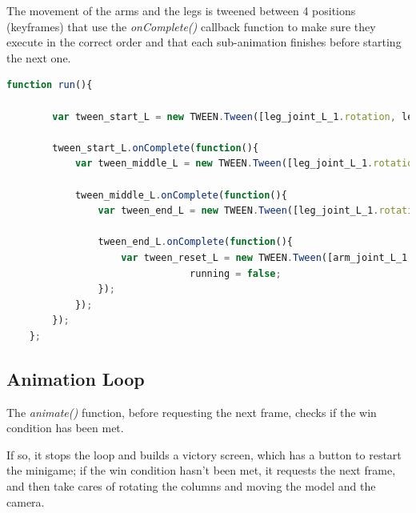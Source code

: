 \documentclass[14pt]{article}
\begin{document}
The movement of the arms and the legs is tweened between 4 positions (keyframes) that use the  \textit{onComplete()} callback function to make sure they execute in the correct order and that each sub-animation finishes before starting the next one.

\bigbreak
\begin{lstlisting}[language=JavaScript, caption={Running animation function for the left side of the body}]
	function run(){
			
		var tween_start_L = new TWEEN.Tween([leg_joint_L_1.rotation, leg_joint_L_2.rotation, arm_joint_L_1.rotation, arm_joint_L_2.rotation]).to([{x:0.312, y: 0.591, z: -3.108}, {x:-1.645, y:-0.005, z:0.614}, {x: 2.903, y: -1.255, z: -2.391}, {x: 0.116, y: 0.268, z: 0.485}], 500).start();

		tween_start_L.onComplete(function(){
			var tween_middle_L = new TWEEN.Tween([leg_joint_L_1.rotation, leg_joint_L_2.rotation, arm_joint_L_1.rotation, arm_joint_L_2.rotation]).to([{x: 0.912, y: 0.591, z: -3.108}, {x:-0.405, y: 0.587, z: 0.192}, {x: 2.903, y: -1.255, z: -1.641}, {x: 0.116, y: 0.268, z: 0.068}], 300).start();
					
			tween_middle_L.onComplete(function(){
				var tween_end_L = new TWEEN.Tween([leg_joint_L_1.rotation, leg_joint_L_2.rotation, arm_joint_L_1.rotation, arm_joint_L_2.rotation]).to([{x: 2.512, y: 0.591, z: -3.108}, {x: -0.847, y: 0.465, z: 0.417}, {x:2.903, y: -1.255, z: -1.041}, {x: -0.084, y: -0.131, z: 1.367}], 700).start();
							
				tween_end_L.onComplete(function(){
					var tween_reset_L = new TWEEN.Tween([arm_joint_L_1.rotation, arm_joint_L_2.rotation]).to([{x: 2.903, y: -1.255, z: -1.641}, {x:0.116, y: 0.268, z: 0.068}], 200).start();
								running = false;
				});
			});
		});
	};
			\end{lstlisting}

\subsection{Animation Loop}
The  \textit{animate()} function, before requesting the next frame, checks if the win condition has been met. 

If so, it stops the loop and builds a victory screen, which has a button to restart the minigame; if the win condition hasn't been met, it requests the next frame, and then take cares of rotating the columns and moving the model and the camera. 
\\
\end{document}
